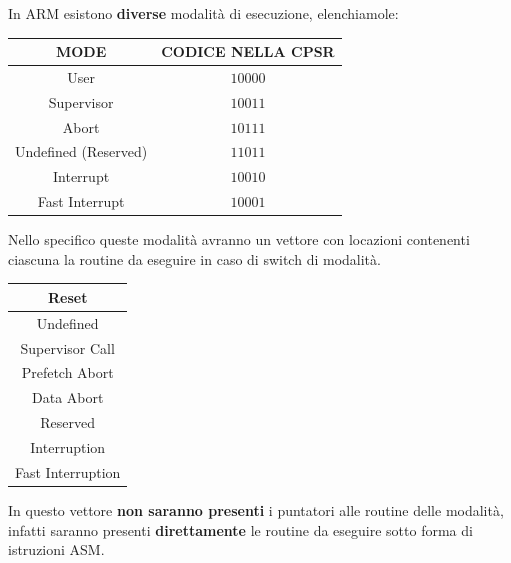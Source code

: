 \documentclass{article}
\begin{document}
In ARM esistono \textbf{diverse} modalità di esecuzione, elenchiamole:

\vspace*{5px}

\begin{center}
    \begin{tabular}{|c|c|}
    \hline
    MODE & CODICE NELLA CPSR  \\
    \hline
    User & $10000$ \\
    \hline
    Supervisor & $10011$ \\
    \hline
    Abort & $10111$ \\
    \hline
    Undefined (Reserved) & $11011$ \\
    \hline
    Interrupt & $10010$ \\
    \hline
    Fast Interrupt & $10001$ \\
    \hline
    \end{tabular}
\end{center}

\vspace*{5px}


Nello specifico queste modalità avranno un vettore con locazioni contenenti ciascuna la routine da eseguire in caso di switch di modalità.

\vspace*{5px}

\begin{center}
        \begin{tabular}{ |c| } %
         \hline
         Reset \\
         \hline
         Undefined \\ 
         \hline
         Supervisor Call \\
         \hline
         Prefetch Abort \\
         \hline
         Data Abort \\
         \hline
         Reserved \\
         \hline
         Interruption \\
         \hline
         Fast Interruption \\
         \hline
        \end{tabular}
    \end{center}

\vspace*{5px}

In questo vettore \textbf{non saranno presenti} i puntatori alle routine delle modalità, infatti saranno presenti \textbf{direttamente} le routine da eseguire sotto forma di istruzioni ASM.
\end{document}
